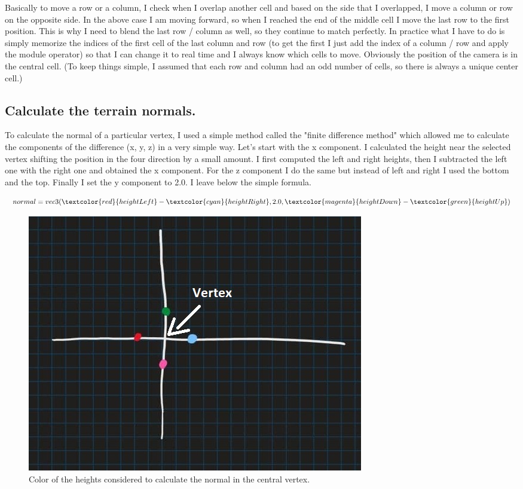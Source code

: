\noindent
Basically to move a row or a column, I check when I overlap another cell and based on the side that I overlapped, I move a column or row on the opposite side. In the above case I am moving forward, so when I reached the end of the middle cell I move the last row to the first position. This is why I need to blend the last row / column as well, so they continue to match perfectly.
In practice what I have to do is simply memorize the indices of the first cell of the last column and row (to get the first I just add the index of a column / row and apply the module operator) so that I can change it to real time and I always know which cells to move.
Obviously the position of the camera is in the central cell. (To keep things simple, I assumed that each row and column had an odd number of cells, so there is always a unique center cell.)

\subsection{Calculate the terrain normals.}
To calculate the normal of a particular vertex, I used a simple method called the "finite difference method" which allowed me to calculate the components of the difference (x, y, z) in a very simple way. Let's start with the x component. I calculated the height near the selected vertex shifting the position in the four direction by a small amount. I first computed the left and right heights, then I subtracted the left one with the right one and obtained the x component. For the z component I do the same but instead of left and right I used the bottom and the top. Finally I set the y component to 2.0. I leave below the simple formula.

\begin{equation}
	normal = vec3(\textcolor{red}{heightLeft} - \textcolor{cyan}{heightRight}, 2.0, \textcolor{magenta}{heightDown} - \textcolor{green}{heightUp})		
\end{equation}

\begin{figure}[hbt!]
	\centering
	\includegraphics[width= 1
	\textwidth]{images/normalSchema.jpg}
	\caption{Color of the heights considered to calculate the normal in the central vertex.}
\end{figure} 

